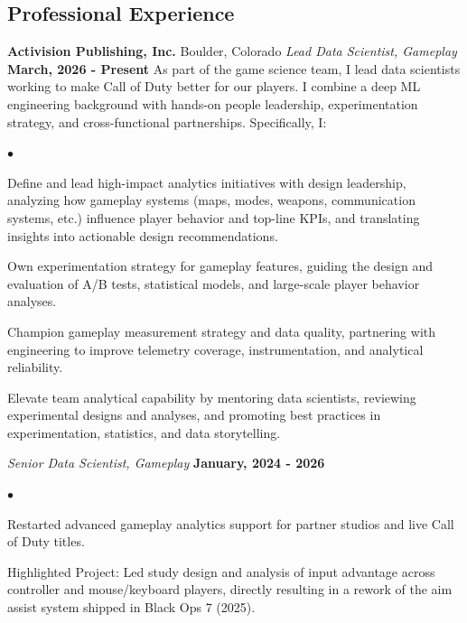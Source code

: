 \documentclass[margin,line, 11pt]{res}
\newenvironment{list2}{
  \begin{list}{$\bullet$}{%
      \setlength{\itemsep}{0in}
      \setlength{\parsep}{0in} \setlength{\parskip}{0in}
      \setlength{\topsep}{0in} \setlength{\partopsep}{0in}
      \setlength{\leftmargin}{0.2in}}}{\end{list}}
\begin{document}
\begin{resume}
\section{Professional \newline Experience}
\textbf{Activision Publishing, Inc.} \hfill Boulder, Colorado\newline
\textit{Lead Data Scientist, Gameplay} \hfill \textbf{March, 2026 - Present}\newline
As part of the game science team, I lead data scientists working to make Call of Duty better for our players. I combine a deep ML engineering background with hands-on people leadership, experimentation strategy, and cross-functional partnerships. Specifically, I:
    \begin{list2}
        \item Define and lead high-impact analytics initiatives with design leadership, analyzing how gameplay systems (maps, modes, weapons, communication systems, etc.) influence player behavior and top-line KPIs, and translating insights into actionable design recommendations.
        \item Own experimentation strategy for gameplay features, guiding the design and evaluation of A/B tests, statistical models, and large-scale player behavior analyses.
        \item Champion gameplay measurement strategy and data quality, partnering with engineering to improve telemetry coverage, instrumentation, and analytical reliability.
        \item Elevate team analytical capability by mentoring data scientists, reviewing experimental designs and analyses, and promoting best practices in experimentation, statistics, and data storytelling.
    \end{list2}
\textit{Senior Data Scientist, Gameplay} \hfill \textbf{January, 2024 - 2026}\newline
    \begin{list2}
        \vspace*{-5mm}
        \item  Restarted advanced gameplay analytics support for partner studios and live Call of Duty titles.
        \item Highlighted Project: Led study design and analysis of input advantage across controller and mouse/keyboard players, directly resulting in a rework of the aim assist system shipped in Black Ops 7 (2025).
    \end{list2}
    \vspace*{-2mm}

\end{resume}
\end{document}
